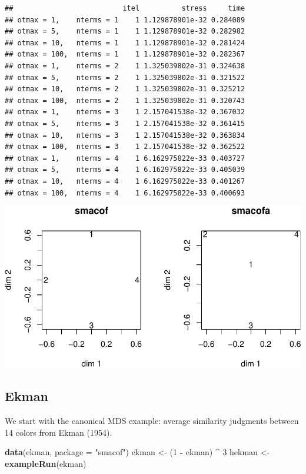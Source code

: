 \documentclass[
  12pt,
]{article}
\newenvironment{Shaded}{\begin{snugshade}}{\end{snugshade}}
\newcommand{\AttributeTok}[1]{\textcolor[rgb]{0.13,0.29,0.53}{#1}}
\newcommand{\DecValTok}[1]{\textcolor[rgb]{0.00,0.00,0.81}{#1}}
\newcommand{\FunctionTok}[1]{\textcolor[rgb]{0.13,0.29,0.53}{\textbf{#1}}}
\newcommand{\NormalTok}[1]{#1}
\newcommand{\OtherTok}[1]{\textcolor[rgb]{0.56,0.35,0.01}{#1}}
\newcommand{\SpecialCharTok}[1]{\textcolor[rgb]{0.81,0.36,0.00}{\textbf{#1}}}
\newcommand{\StringTok}[1]{\textcolor[rgb]{0.31,0.60,0.02}{#1}}
\begin{document}
\begin{verbatim}
##                          itel          stress     time
## otmax = 1,    nterms = 1    1 1.129878901e-32 0.284089
## otmax = 5,    nterms = 1    1 1.129878901e-32 0.282982
## otmax = 10,   nterms = 1    1 1.129878901e-32 0.281424
## otmax = 100,  nterms = 1    1 1.129878901e-32 0.282367
## otmax = 1,    nterms = 2    1 1.325039802e-31 0.324638
## otmax = 5,    nterms = 2    1 1.325039802e-31 0.321522
## otmax = 10,   nterms = 2    1 1.325039802e-31 0.325212
## otmax = 100,  nterms = 2    1 1.325039802e-31 0.320743
## otmax = 1,    nterms = 3    1 2.157041538e-32 0.367032
## otmax = 5,    nterms = 3    1 2.157041538e-32 0.361415
## otmax = 10,   nterms = 3    1 2.157041538e-32 0.363834
## otmax = 100,  nterms = 3    1 2.157041538e-32 0.362522
## otmax = 1,    nterms = 4    1 6.162975822e-33 0.403727
## otmax = 5,    nterms = 4    1 6.162975822e-33 0.405039
## otmax = 10,   nterms = 4    1 6.162975822e-33 0.401267
## otmax = 100,  nterms = 4    1 6.162975822e-33 0.400693
\end{verbatim}

\includegraphics{mSmacof_files/figure-latex/trosmatplot-1.pdf}

\subsection{Ekman}\label{ekman}

We start with the canonical MDS example: average similarity judgments between 14 colors from Ekman (1954).

\begin{Shaded}
\begin{Highlighting}[]
\FunctionTok{data}\NormalTok{(ekman, }\AttributeTok{package =} \StringTok{"smacof"}\NormalTok{)}
\NormalTok{ekman }\OtherTok{\textless{}{-}}\NormalTok{ (}\DecValTok{1} \SpecialCharTok{{-}}\NormalTok{ ekman) }\SpecialCharTok{\^{}} \DecValTok{3}
\NormalTok{hekman }\OtherTok{\textless{}{-}} \FunctionTok{exampleRun}\NormalTok{(ekman)}
\end{Highlighting}
\end{Shaded}
\end{document}
